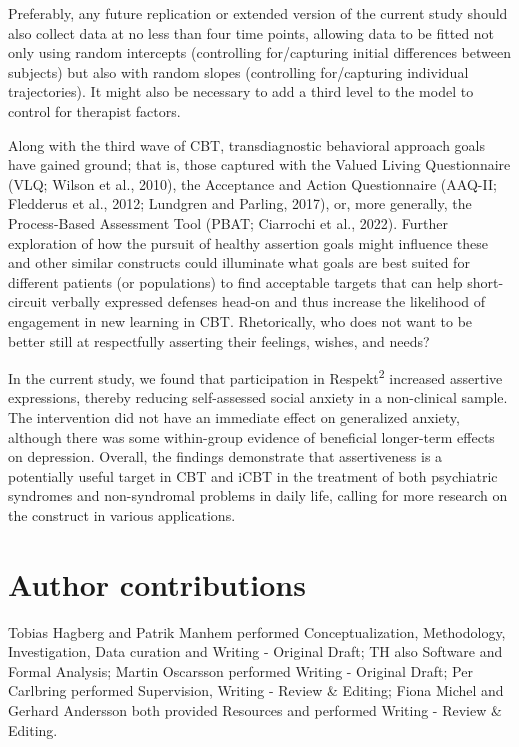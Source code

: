 \documentclass[preprint,
3p]{elsarticle} %
\begin{document}
Preferably, any future replication or extended version of the current
study should also collect data at no less than four time points,
allowing data to be fitted not only using random intercepts (controlling
for/capturing initial differences between subjects) but also with random
slopes (controlling for/capturing individual trajectories). It might
also be necessary to add a third level to the model to control for
therapist factors.

Along with the third wave of CBT, transdiagnostic behavioral approach
goals have gained ground; that is, those captured with the Valued Living
Questionnaire (VLQ; Wilson et al., 2010), the Acceptance and Action
Questionnaire (AAQ-II; Fledderus et al., 2012; Lundgren and Parling,
2017), or, more generally, the Process-Based Assessment Tool (PBAT;
Ciarrochi et al., 2022). Further exploration of how the pursuit of
healthy assertion goals might influence these and other similar
constructs could illuminate what goals are best suited for different
patients (or populations) to find acceptable targets that can help
short-circuit verbally expressed defenses head-on and thus increase the
likelihood of engagement in new learning in CBT. Rhetorically, who does
not want to be better still at respectfully asserting their feelings,
wishes, and needs?

In the current study, we found that participation in
Respekt\textsuperscript{2} increased assertive expressions, thereby
reducing self-assessed social anxiety in a non-clinical sample. The
intervention did not have an immediate effect on generalized anxiety,
although there was some within-group evidence of beneficial longer-term
effects on depression. Overall, the findings demonstrate that
assertiveness is a potentially useful target in CBT and iCBT in the
treatment of both psychiatric syndromes and non-syndromal problems in
daily life, calling for more research on the construct in various
applications.

\hypertarget{author-contributions}{%
\section{Author contributions}\label{author-contributions}}

Tobias Hagberg and Patrik Manhem performed Conceptualization,
Methodology, Investigation, Data curation and Writing - Original Draft;
TH also Software and Formal Analysis; Martin Oscarsson performed Writing
- Original Draft; Per Carlbring performed Supervision, Writing - Review
\& Editing; Fiona Michel and Gerhard Andersson both provided Resources
and performed Writing - Review \& Editing.
\end{document}
